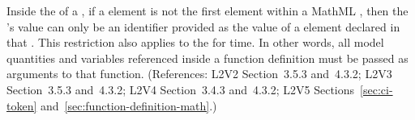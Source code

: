 Inside the  of a \FunctionDefinition, if a  element
is not the first element within a MathML , then the
's value can only be an identifier provided as the
value of a  element declared in that .
This restriction also applies to the  for time.
In other words, all model quantities and variables referenced
inside a function definition must be passed as arguments to that function.
(References: L2V2 Section~3.5.3 and~4.3.2; L2V3 Section~3.5.3 and~4.3.2; L2V4 Section~3.4.3 and~4.3.2;
L2V5 Sections~\ref{sec:ci-token} and~\ref{sec:function-definition-math}.)
